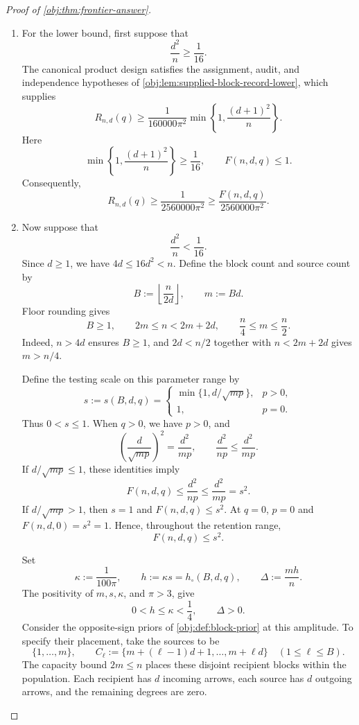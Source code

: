 \documentclass[11pt]{article}
\begin{document}
\begin{proof}[Proof of \cref{obj:thm:frontier-answer}]
\begin{enumerate}
\item For the lower bound, first suppose that
\[
\frac{d^2}{n}\ge\frac1{16}.
\]
The canonical product design satisfies the assignment, audit, and independence hypotheses of \cref{obj:lem:supplied-block-record-lower}, which supplies
\[
R_{n,d}(q)\ge
\frac1{160000\pi^2}
\min\left\{1,\frac{(d+1)^2}{n}\right\}.
\]
Here
\[
\min\left\{1,\frac{(d+1)^2}{n}\right\}\ge\frac1{16},
\qquad
F(n,d,q)\le1.
\]
Consequently,
\[
R_{n,d}(q)
\ge\frac1{2560000\pi^2}
\ge\frac{F(n,d,q)}{2560000\pi^2}.
\]

\item Now suppose that
\[
\frac{d^2}{n}<\frac1{16}.
\]
Since \(d\ge1\), we have \(4d\le16d^2<n\). Define the block count and source count by
\[
B:=\left\lfloor\frac{n}{2d}\right\rfloor,
\qquad
m:=Bd.
\]
Floor rounding gives
\[
B\ge1,
\qquad
2m\le n<2m+2d,
\qquad
\frac n4\le m\le\frac n2.
\]
Indeed, \(n>4d\) ensures \(B\ge1\), and \(2d<n/2\) together with
\(n<2m+2d\) gives \(m>n/4\).

Define the testing scale on this parameter range by
\[
s:=s(B,d,q)=
\begin{cases}
\min\{1,d/\sqrt{mp}\},&p>0,\\
1,&p=0.
\end{cases}
\]
Thus \(0<s\le1\). When \(q>0\), we have \(p>0\), and
\[
\left(\frac d{\sqrt{mp}}\right)^2=\frac{d^2}{mp},
\qquad
\frac{d^2}{np}\le\frac{d^2}{mp}.
\]
If \(d/\sqrt{mp}\le1\), these identities imply
\[
F(n,d,q)\le\frac{d^2}{np}\le\frac{d^2}{mp}=s^2.
\]
If \(d/\sqrt{mp}>1\), then \(s=1\) and \(F(n,d,q)\le s^2\).
At \(q=0\), \(p=0\) and \(F(n,d,0)=s^2=1\). Hence, throughout the retention range,
\[
F(n,d,q)\le s^2.
\]

Set
\[
\kappa:=\frac1{100\pi},
\qquad
h:=\kappa s=h_\circ(B,d,q),
\qquad
\Delta:=\frac{mh}{n}.
\]
The positivity of \(m,s,\kappa\), and \(\pi>3\), give
\[
0<h\le\kappa<\frac14,
\qquad
\Delta>0.
\]
Consider the opposite-sign priors of \cref{obj:def:block-prior} at this amplitude. To specify their placement, take the sources to be
\[
\{1,\ldots,m\},
\qquad
C_\ell:=\{m+(\ell-1)d+1,\ldots,m+\ell d\}
\quad(1\le\ell\le B).
\]
The capacity bound \(2m\le n\) places these disjoint recipient blocks within the population. Each recipient has \(d\) incoming arrows, each source has \(d\) outgoing arrows, and the remaining degrees are zero.


\end{enumerate}
\end{proof}
\end{document}
